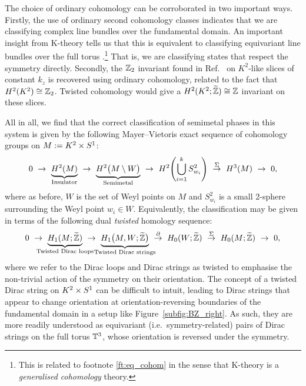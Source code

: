 The choice of ordinary cohomology can be corroborated in two important ways. Firstly, the use of ordinary second cohomology classes indicates that we are classifying complex line bundles over the fundamental domain. An important insight from K-theory tells us that this is equivalent to classifying equivariant line bundles over the full torus \parencite[Prop. 2.1]{Segal_K-theory}.\footnote{
	This is related to footnote \ref{ft:eq_cohom} in the sense that K-theory is a \emph{generalised cohomology} theory.}
That is, we are classifying states that respect the symmetry directly. Secondly, the $\mathbb{Z}_2$ invariant found in Ref.~\cite{Fonseca-Vaidya_nonorientable} on $K^2$-like slices of constant $k_z$ is recovered using ordinary cohomology, related to the fact that $H^2(K^2)\cong\mathbb{Z}_2$. Twisted cohomology would give a $H^2(K^2;\widetilde{\mathbb{Z}})\cong\mathbb{Z}$ invariant on these slices.

All in all, we find that the correct classification of semimetal phases in this system is given by the following Mayer--Vietoris exact sequence of cohomology groups on $M := K^2\times S^1$:
\begin{equation}\label{eq:MV-nonorientable}
	0\ \to\ \underbrace{H^2(M)}_{\mathclap{\text{Insulator}}}\ \to\ \underbrace{H^2\big(M\setminus W\big)}_{\mathclap{\text{Semimetal}}}\ \to\ H^2\!\left(\bigcup_{i=1}^k S_{w_i}^2\right)\ \overset{\Sigma}{\to}\ H^3(M)\ \to\ 0,
\end{equation}
where as before, $W$ is the set of Weyl points on $M$ and $S_{w_i}^2$ is a small 2-sphere surrounding the Weyl point $w_i\in W$. Equivalently, the classification may be given in terms of the following dual \emph{twisted} homology sequence:
\begin{equation}\label{eq:homology-sequence-nonorientable}
	0\ \to\ \underbrace{H_1(M;\ext{\Z})}_{\mathclap{\text{Twisted Dirac loops}}}\ \to\ \underbrace{H_1\big(M, W;\ext{\Z}\big)}_{\mathclap{\text{Twisted Dirac strings}}}\ \overset{\partial}{\to}\ H_0(W;\ext{\Z})\ \overset{\Sigma}{\to}\ H_0(M;\ext{\Z})\ \to\ 0,
\end{equation}
where we refer to the Dirac loops and Dirac strings as twisted to emphasise the non-trivial action of the symmetry on their orientation. The concept of a twisted Dirac string on $K^2\times S^1$ can be difficult to intuit, leading to Dirac strings that appear to change orientation at orientation-reversing boundaries of the fundamental domain in a setup like Figure~\ref{subfig:BZ_right}. As such, they are more readily understood as equivariant (i.e.\ symmetry-related) pairs of Dirac strings on the full torus $\mathbb{T}^3$, whose orientation is reversed under the symmetry.

